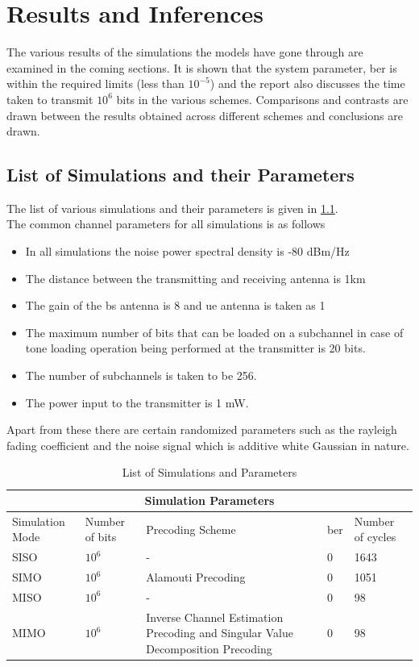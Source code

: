 \chapter{Results and Inferences}

The various results of the simulations the models have gone through are examined in the coming sections. It is shown that the system parameter, \acrshort{ber} is within the required limits (less than $10^{-5}$) and the report also discusses the time taken to transmit $10^6$ bits in the various schemes. Comparisons and contrasts are drawn between the results obtained across different schemes and conclusions are drawn.

\section{List of Simulations and their Parameters}
The list of various simulations and their parameters is given in \ref{List of Simulations and their Parameters}.\\

The common channel parameters for all simulations is as follows
\begin{itemize}
\item In all simulations the noise power spectral density is -80 dBm/Hz
\item The distance between the transmitting and receiving antenna is 1km
\item The gain of the \acrshort{bs} antenna is 8 and \acrshort{ue} antenna is taken as 1
\item The maximum number of bits that can be loaded on a subchannel in case of tone loading operation being performed at the transmitter is 20 bits.
\item The number of subchannels is taken to be 256.
\item The power input to the transmitter is 1 mW.
\end{itemize}

Apart from these there are certain randomized parameters such as the \gls{rayleigh fading} coefficient and the noise signal which is additive white Gaussian in nature.

\begin{table}[htpb]
\centering
\label{List of Simulations and their Parameters}
\caption{List of Simulations and Parameters}
\begin{tabular}{ |p{3cm}||p{3cm}|p{3cm}|p{3cm}| |p{3cm}|}
 \hline
 \multicolumn{5}{|c|}{Simulation Parameters} \\
 \hline
 Simulation Mode & Number of bits & Precoding Scheme & \acrshort{ber} & Number of cycles\\
 \hline
 SISO & $10^6$    & - &   0 & 1643\\
 SIMO & $10^6$    & Alamouti Precoding &   0 & 1051\\
 MISO & $10^6$    & - &   0 & 98\\
 MIMO & $10^6$    & Inverse Channel Estimation Precoding and Singular Value Decomposition Precoding &   0 & 98\\
 \hline
\end{tabular}
\end{table}

